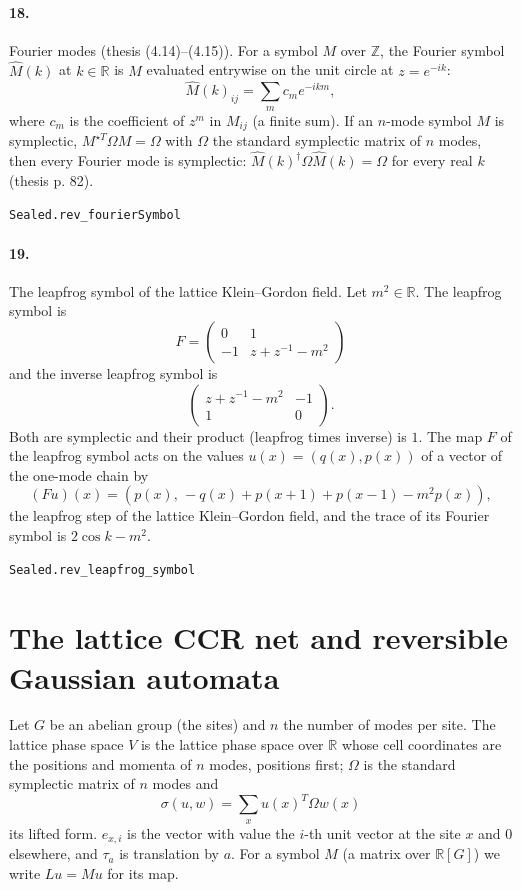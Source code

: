 \documentclass[11pt]{article}
\begin{document}
\paragraph{18.} Fourier modes (thesis (4.14)–(4.15)). For a symbol $M$ over $\mathbb Z$, the Fourier symbol $\hat M(k)$ at $k \in \mathbb R$ is $M$ evaluated entrywise on the unit circle at $z = e^{-ik}$: \[\hat M(k)_{ij} = \sum_m c_m e^{-ikm},\] where $c_m$ is the coefficient of $z^m$ in $M_{ij}$ (a finite sum). If an $n$-mode symbol $M$ is symplectic, $M^{\star T} \Omega M = \Omega$ with $\Omega$ the standard symplectic matrix of $n$ modes, then every Fourier mode is symplectic: $\hat M(k)^\dagger \Omega \hat M(k) = \Omega$ for every real $k$ (thesis p. 82).\par{\footnotesize\texttt{Sealed.rev\_fourierSymbol}}

\paragraph{19.} The leapfrog symbol of the lattice Klein–Gordon field. Let $m^2 \in \mathbb R$. The leapfrog symbol is \[\hat F = \begin{pmatrix} 0 & 1 \\ -1 & z + z^{-1} - m^2 \end{pmatrix}\] and the inverse leapfrog symbol is \[\begin{pmatrix} z + z^{-1} - m^2 & -1 \\ 1 & 0 \end{pmatrix}.\] Both are symplectic and their product (leapfrog times inverse) is $1$. The map $F$ of the leapfrog symbol acts on the values $u(x) = (q(x), p(x))$ of a vector of the one-mode chain by \[(F u)(x) = (p(x),\, -q(x) + p(x + 1) + p(x - 1) - m^2 p(x)),\] the leapfrog step of the lattice Klein–Gordon field, and the trace of its Fourier symbol is $2 \cos k - m^2$.\par{\footnotesize\texttt{Sealed.rev\_leapfrog\_symbol}}

\section*{The lattice CCR net and reversible Gaussian automata}
Let $G$ be an abelian group (the sites) and $n$ the number of modes per site. The lattice phase space $V$ is the lattice phase space over $\mathbb R$ whose cell coordinates are the positions and momenta of $n$ modes, positions first; $\Omega$ is the standard symplectic matrix of $n$ modes and \[\sigma(u, w) = \sum_x u(x)^T \Omega w(x)\] its lifted form. $e_{x,i}$ is the vector with value the $i$-th unit vector at the site $x$ and $0$ elsewhere, and $\tau_a$ is translation by $a$. For a symbol $M$ (a matrix over $\mathbb R[G]$) we write $L u = M u$ for its map.
\end{document}
